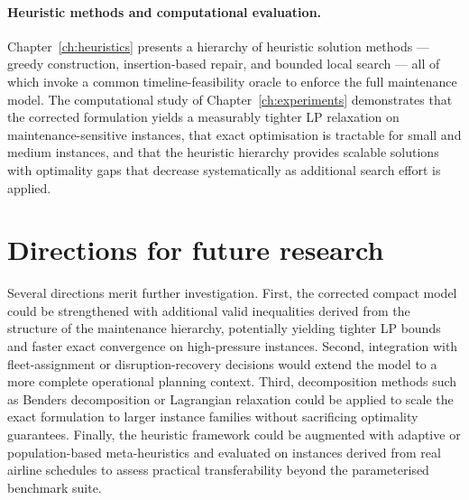\paragraph{Heuristic methods and computational evaluation.}
Chapter~\ref{ch:heuristics} presents a hierarchy of heuristic solution methods --- greedy construction, insertion-based repair, and bounded local search --- all of which invoke a common timeline-feasibility oracle to enforce the full maintenance model. The computational study of Chapter~\ref{ch:experiments} demonstrates that the corrected formulation yields a measurably tighter LP relaxation on maintenance-sensitive instances, that exact optimisation is tractable for small and medium instances, and that the heuristic hierarchy provides scalable solutions with optimality gaps that decrease systematically as additional search effort is applied.

\section*{Directions for future research}

Several directions merit further investigation. First, the corrected compact model could be strengthened with additional valid inequalities derived from the structure of the maintenance hierarchy, potentially yielding tighter LP bounds and faster exact convergence on high-pressure instances. Second, integration with fleet-assignment or disruption-recovery decisions would extend the model to a more complete operational planning context. Third, decomposition methods such as Benders decomposition or Lagrangian relaxation could be applied to scale the exact formulation to larger instance families without sacrificing optimality guarantees. Finally, the heuristic framework could be augmented with adaptive or population-based meta-heuristics and evaluated on instances derived from real airline schedules to assess practical transferability beyond the parameterised benchmark suite.
